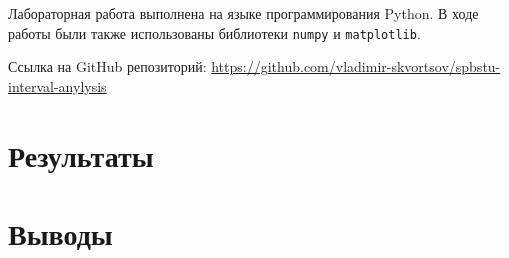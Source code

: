 \documentclass{article}
\begin{document}
  Лабораторная работа выполнена на языке программирования Python. В ходе
  работы были также использованы библиотеки \verb!numpy! и
  \verb!matplotlib!.

  Ссылка на GitHub репозиторий:
  \href{https://github.com/vladimir-skvortsov/spbstu-interval-anylysis}
  {https://github.com/vladimir-skvortsov/spbstu-interval-anylysis}

  \clearpage

  \section{Результаты}

  \section{Выводы}
\end{document}
